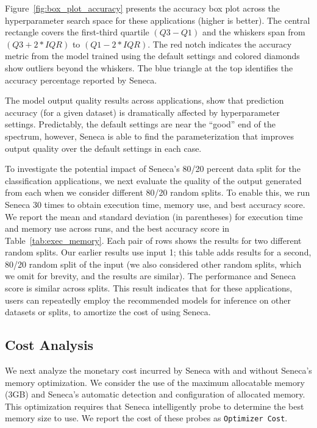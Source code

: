Figure~\ref{fig:box_plot_accuracy} presents the accuracy box plot across the hyperparameter search space for these applications (higher is better).  
The central rectangle covers the first-third quartile
\texttt{$(Q3 - Q1)$} and the whiskers span from \texttt{$(Q3 + 2 * IQR)$} to \texttt{$(Q1 - 2 * IQR)$}.
The red notch indicates the accuracy metric from the model trained using the default
settings and colored diamonds show outliers beyond the whiskers.
The blue triangle at the top identifies the accuracy percentage reported by Seneca.

The model output quality results across applications, show that prediction
accuracy (for a given dataset) is dramatically
affected by hyperparameter settings.  Predictably, the default settings are
near the ``good'' end of the spectrum, however, Seneca is able to find the
parameterization that improves output quality over the default settings
in each case.

To investigate the potential impact of Seneca's 80/20 percent data split for the classification
applications, we next evaluate the quality of the output generated from 
each when we consider different 80/20 random splits.
To enable this, we run Seneca 30 times to obtain execution time, memory use, 
and best accuracy score. We report the
mean and standard deviation (in parentheses) 
for execution time and memory use across runs,
and the best accuracy score in
Table~\ref{tab:exec_memory}. Each pair of rows shows the results for two different random splits.
Our earlier results use input 1; this table adds results for a second, 80/20 
random split of the input (we also considered other random splits, which we omit for brevity, 
and the results are similar).  The performance and Seneca score is similar across splits. 
This result indicates that for these applications, 
users can repeatedly employ the recommended models for inference on other datasets or splits,
to amortize the cost of using Seneca.

\subsection{Cost Analysis}

We next analyze the monetary cost incurred by Seneca with and without 
Seneca's memory optimization.
We consider the use of the maximum allocatable memory (3GB) and Seneca's 
automatic detection and configuration of allocated memory.
This optimization requires
that Seneca intelligently probe to determine the best memory size 
to use.  We report the cost of these probes as \texttt{Optimizer Cost}.

